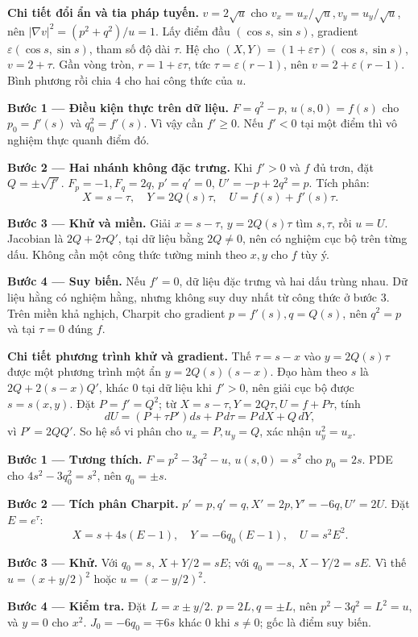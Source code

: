 \textbf{Chi tiết đổi ẩn và tia pháp tuyến.} $v=2\sqrt u$ cho $v_x=u_x/\sqrt u,v_y=u_y/\sqrt u$, nên $|\nabla v|^2=(p^2+q^2)/u=1$. Lấy điểm đầu $(\cos s,\sin s)$, gradient $\varepsilon(\cos s,\sin s)$, tham số độ dài $\tau$. Hệ cho $(X,Y)=(1+\varepsilon\tau)(\cos s,\sin s)$, $v=2+\tau$. Gần vòng tròn, $r=1+\varepsilon\tau$, tức $\tau=\varepsilon(r-1)$, nên $v=2+\varepsilon(r-1)$. Bình phương rồi chia $4$ cho hai công thức của $u$.

\textbf{Bước 1 — Điều kiện thực trên dữ liệu.} $F=q^2-p$, $u(s,0)=f(s)$ cho $p_0=f'(s)$ và $q_0^2=f'(s)$. Vì vậy cần $f'\ge0$. Nếu $f'<0$ tại một điểm thì vô nghiệm thực quanh điểm đó.

\textbf{Bước 2 — Hai nhánh không đặc trưng.} Khi $f'>0$ và $f$ đủ trơn, đặt $Q=\pm\sqrt{f'}$. $F_p=-1,F_q=2q$, $p'=q'=0$, $U'=-p+2q^2=p$. Tích phân:
\[X=s-\tau,\quad Y=2Q(s)\tau,\quad U=f(s)+f'(s)\tau.\]

\textbf{Bước 3 — Khử và miền.} Giải $x=s-\tau$, $y=2Q(s)\tau$ tìm $s,\tau$, rồi $u=U$. Jacobian là $2Q+2\tau Q'$, tại dữ liệu bằng $2Q\ne0$, nên có nghiệm cục bộ trên từng dấu. Không cần một công thức tường minh theo $x,y$ cho $f$ tùy ý.

\textbf{Bước 4 — Suy biến.} Nếu $f'=0$, dữ liệu đặc trưng và hai dấu trùng nhau. Dữ liệu hằng có nghiệm hằng, nhưng không suy duy nhất từ công thức ở bước 3. Trên miền khả nghịch, Charpit cho gradient $p=f'(s),q=Q(s)$, nên $q^2=p$ và tại $\tau=0$ đúng $f$.

\textbf{Chi tiết phương trình khử và gradient.} Thế $\tau=s-x$ vào $y=2Q(s)\tau$ được một phương trình một ẩn $y=2Q(s)(s-x)$. Đạo hàm theo $s$ là $2Q+2(s-x)Q'$, khác $0$ tại dữ liệu khi $f'>0$, nên giải cục bộ được $s=s(x,y)$. Đặt $P=f'=Q^2$; từ $X=s-\tau,Y=2Q\tau,U=f+P\tau$, tính
\[dU=(P+\tau P')ds+P\,d\tau=P\,dX+Q\,dY,\]
vì $P'=2QQ'$. So hệ số vi phân cho $u_x=P,u_y=Q$, xác nhận $u_y^2=u_x$.

\textbf{Bước 1 — Tương thích.} $F=p^2-3q^2-u$, $u(s,0)=s^2$ cho $p_0=2s$. PDE cho $4s^2-3q_0^2=s^2$, nên $q_0=\pm s$.

\textbf{Bước 2 — Tích phân Charpit.} $p'=p,q'=q,X'=2p,Y'=-6q,U'=2U$. Đặt $E=e^\tau$:
\[X=s+4s(E-1),\quad Y=-6q_0(E-1),\quad U=s^2E^2.\]

\textbf{Bước 3 — Khử.} Với $q_0=s$, $X+Y/2=sE$; với $q_0=-s$, $X-Y/2=sE$. Vì thế $u=(x+y/2)^2$ hoặc $u=(x-y/2)^2$.

\textbf{Bước 4 — Kiểm tra.} Đặt $L=x\pm y/2$. $p=2L,q=\pm L$, nên $p^2-3q^2=L^2=u$, và $y=0$ cho $x^2$. $J_0=-6q_0=\mp6s$ khác 0 khi $s\ne0$; gốc là điểm suy biến.

